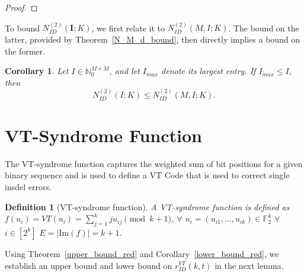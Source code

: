 \documentclass[11 pt]{article}
\numberwithin{equation}{section}
\newtheorem{corollary}[theorem]{Corollary}
\newtheorem{definition}[theorem]{Definition}
\begin{document}
\begin{proof}
\end{proof}



    
    To bound $N_{ID}^{(2)}(\mathbf{I};K)$, we first relate it to $N_{ID}^{(2)}(M,I;K)$. The bound on the latter, provided by Theorem~\ref{N_M_d_bound}, then directly implies a bound on the former.
    
    \begin{corollary}\label{bound_Imax}
    Let ${I} \in \mathbb{N}_0^{M\times M}$, and let $I_{max}$ denote its largest entry. If $I_{max} \leq I$, then
    \[
        N_{ID}^{(2)}({I};K) \leq N_{ID}^{(2)}(M,I;K).
    \]
    \end{corollary}

 

\section{VT-Syndrome Function}
    The VT-syndrome function captures the weighted sum of bit positions for a given binary sequence and is used to define a VT Code that is used to correct single insdel errors.
    
    \begin{definition}[VT-syndrome function]
        A VT-syndrome function is defined as $f(u_i) = VT(u_i) = \sum_{j = 1}^{k} ju_{ij} \pmod{k+1}$, $\forall$ $u_i = (u_{i1}, \ldots, u_{ik}) \in \mathbb{F}_2^k$   $\forall$ $i \in [2^k]$  $E = |\mathrm{Im}(f)| = k+1.$
    \end{definition}

    Using Theorem~\ref{upper_bound_red} and Corollary~\ref{lower_bound_red}, we establish an upper bound and lower bound on $r^{VT}_{ID}(k,t)$ in the next lemma.
    
\end{document}
